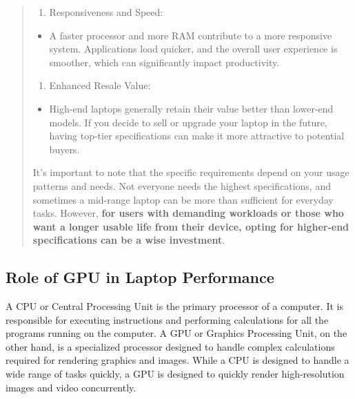 \begin{leftbar}
\begin{quote}
\begin{enumerate}[leftmargin=*]
 \item
 Responsiveness and Speed:
 \end{enumerate}
 
 \begin{itemize}
 
 \item
 A faster processor and more RAM contribute to a more responsive system. Applications load quicker, and the overall user experience is smoother, which can significantly impact productivity.
 \end{itemize}
 
 \begin{enumerate}[leftmargin=*]
 \def\labelenumi{\arabic{enumi}.}
 \setcounter{enumi}{7}
 
 \item
 Enhanced Resale Value:
 \end{enumerate}
 
 \begin{itemize}
 
 \item
 High-end laptops generally retain their value better than lower-end models. If you decide to sell or upgrade your laptop in the future, having top-tier specifications can make it more attractive to potential buyers.
 \end{itemize}
 
 It's important to note that the specific requirements depend on your usage patterns and needs. Not everyone needs the highest specifications, and sometimes a mid-range laptop can be more than sufficient for everyday tasks. However, \textbf{for users with demanding workloads or those who want a longer usable life from their device, opting for higher-end specifications can be a wise investment}.
 \end{quote}\end{leftbar}
 
 \pagebreak \hypertarget{gpu-needs}{}\subsection{Role of GPU in Laptop Performance}\label{gpu-needs}
 A CPU or Central Processing Unit is the primary processor of a computer. It is responsible for executing instructions and performing calculations for all the programs running on the computer. A GPU or Graphics Processing Unit, on the other hand, is a specialized processor designed to handle complex calculations required for rendering graphics and images. While a CPU is designed to handle a wide range of tasks quickly, a GPU is designed to quickly render high-resolution images and video concurrently.
 
